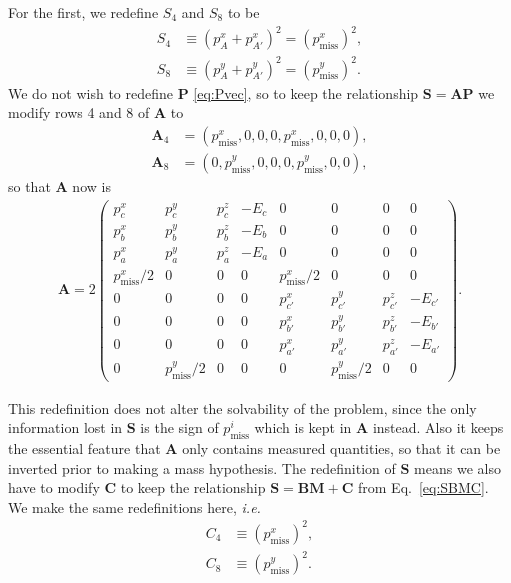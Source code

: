 \documentclass[twoside,english]{uiofysmaster}
\begin{document}
For the first, we redefine $S_4$ and $S_8$ to be 
\begin{align}
	S_4 &\equiv (p_A^x + p_{A'}^x)^2 = (p_\mathrm{miss}^x)^2, \label{eq:Svec_modified} \\
	S_8 &\equiv (p_A^y + p_{A'}^y)^2 = (p_\mathrm{miss}^y)^2. \nonumber
\end{align}
We do not wish to redefine $\mathbf{P}$ \eqref{eq:Pvec}, so to keep the relationship $\mathbf{S} = \mathbf{A}\mathbf{P}$ we modify rows 4 and 8 of $\mathbf{A}$ to
\begin{align}
	\mathbf{A}_4 &= (p_\mathrm{miss}^x, 0, 0, 0, p_\mathrm{miss}^x, 0, 0, 0),\\
	\mathbf{A}_8 &= (0, p_\mathrm{miss}^y, 0, 0, 0, p_\mathrm{miss}^y, 0, 0),\nonumber
\end{align}
so that $\mathbf{A}$ now is
\begin{align}
	\mathbf{A} = 2 \begin{pmatrix}
						p_c^x & p_c^y & p_c^z & -E_c & 0 & 0 & 0 & 0 \\
						p_b^x & p_b^y & p_b^z & -E_b & 0 & 0 & 0 & 0 \\
						p_a^x & p_a^y & p_a^z & -E_a & 0 & 0 & 0 & 0 \\
						p_\mathrm{miss}^x/2 & 0 & 0 & 0 & p_\mathrm{miss}^x/2 & 0 & 0 & 0\\
						0 & 0 & 0 & 0 & p_{c'}^x & p_{c'}^y & p_{c'}^z & -E_{c'} \\
						0 & 0 & 0 & 0 & p_{b'}^x & p_{b'}^y & p_{b'}^z & -E_{b'} \\
						0 & 0 & 0 & 0 & p_{a'}^x & p_{a'}^y & p_{a'}^z & -E_{a'} \\
						0 & p_\mathrm{miss}^y/2 & 0 & 0 & 0 & p_\mathrm{miss}^y/2 & 0 & 0
					\end{pmatrix}. \label{eq:Amatrix_modified}
\end{align}

This redefinition does not alter the solvability of the problem, since the only information lost in $\mathbf{S}$ is the sign of $p_\mathrm{miss}^i$ which is kept in $\mathbf{A}$ instead. Also it keeps the essential feature that $\mathbf{A}$ only contains measured quantities, so that it can be inverted prior to making a mass hypothesis. The redefinition of $\mathbf{S}$ means we also have to modify $\mathbf{C}$ to keep the relationship $\mathbf{S} = \mathbf{B} \mathbf{M} + \mathbf{C}$ from Eq.\ \eqref{eq:SBMC}. We make the same redefinitions here, {\it i.e.}
\begin{align}
	C_4 &\equiv (p_\mathrm{miss}^x)^2, \label{eq:Cvec_modified} \\
	C_8 &\equiv (p_\mathrm{miss}^y)^2. \nonumber
\end{align}
\end{document}
